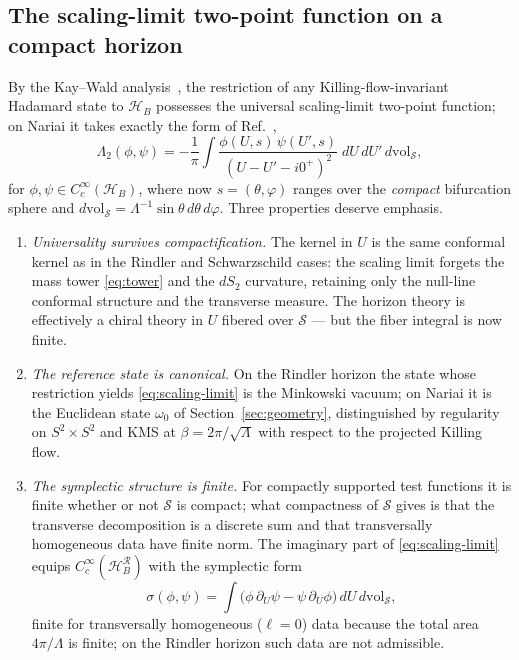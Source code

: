 \documentclass[11pt]{article}
\newcommand{\Nariai}{Nariai}
\begin{document}
\subsection{The scaling-limit two-point function on a compact horizon}

By the Kay--Wald analysis~\cite{KayWald}, the restriction of any Killing-flow-invariant Hadamard state to $\mathcal{H}_B$ possesses the universal scaling-limit two-point function; on \Nariai{} it takes exactly the form of Ref.~\cite{DorauMuch},
\begin{equation}
\Lambda_2(\phi, \psi)
= -\frac{1}{\pi} \int
\frac{\phi(U, s)\, \psi(U', s)}{(U - U' - i0^+)^2}\;
dU\, dU'\, d\mathrm{vol}_{\mathcal{S}},
\label{eq:scaling-limit}
\end{equation}
for $\phi, \psi \in C^\infty_c(\mathcal{H}_B)$, where now $s = (\theta,\varphi)$ ranges over the \emph{compact} bifurcation sphere and $d\mathrm{vol}_{\mathcal{S}} = \Lambda^{-1} \sin\theta\, d\theta\, d\varphi$. Three properties deserve emphasis.

\begin{enumerate}
\item \emph{Universality survives compactification.} The kernel in $U$ is the same conformal kernel as in the Rindler and Schwarzschild cases: the scaling limit forgets the mass tower \eqref{eq:tower} and the $dS_2$ curvature, retaining only the null-line conformal structure and the transverse measure. The horizon theory is effectively a chiral theory in $U$ fibered over $\mathcal{S}$ --- but the fiber integral is now finite.

\item \emph{The reference state is canonical.} On the Rindler horizon the state whose restriction yields \eqref{eq:scaling-limit} is the Minkowski vacuum; on \Nariai{} it is the Euclidean state $\omega_0$ of Section~\ref{sec:geometry}, distinguished by regularity on $S^2\times S^2$ and KMS at $\beta = 2\pi/\sqrt{\Lambda}$ with respect to the projected Killing flow.

\item \emph{The symplectic structure is finite.} For compactly supported test functions it is finite whether or not $\mathcal{S}$ is compact; what compactness of $\mathcal{S}$ gives is that the transverse decomposition is a discrete sum and that transversally homogeneous data have finite norm. The imaginary part of \eqref{eq:scaling-limit} equips $C^\infty_c(\mathcal{H}_B^{\mathcal{R}})$ with the symplectic form
\begin{equation}
\sigma(\phi,\psi)
= \int \big(\phi\,\partial_U \psi - \psi\,\partial_U \phi\big)\, dU\, d\mathrm{vol}_{\mathcal{S}},
\label{eq:symplectic}
\end{equation}
finite for transversally homogeneous ($\ell = 0$) data because the total area $4\pi/\Lambda$ is finite; on the Rindler horizon such data are not admissible.

\end{enumerate}
\end{document}
